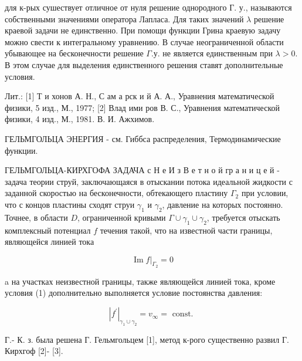 \documentclass[10pt]{article}
\begin{document}
для к-рых сушествует отличное от нуля решение однородного Г. у., называются собственными значениями оператора Лапласа. Для таких значений $\lambda$ решение краевой задачи не единственно. При помощи функции Грина краевую задачу можно свести к интегральному уравнению. В случае неограниченной области убывающее на бесконечности решение $\Gamma$.у. не является единственным при $\lambda>0$. В этом случае для выделения единственного решения ставят дополнительные условия.



Лит.: [1] Т и хонов А. Н., С ам а рск и й А. А., Уравнения математической физики, 5 изд., М., 1977; [2] Влад ими ров В. С., Уравнения математической физики, 4 изд., М., 1981. В. И. Ажхимов.



ГЕЛЬМГОЛЬЦА ЭНЕРГИЯ - см. Гиббса распределения, Термодинамические функции.



ГЕЛЬМГОЛЬЦА-КИРХГОФА ЗАДАЧА с Н е И з В е т н о й гр а н и ц е й - задача теории струй, заключающаяся в отыскании потока идеальной жидкости с заданной скоростью на бесконечности, обтекающего пластину $\Gamma_{2}$ при условии, что с концов пластины сходят струи $\gamma_{1}$ и $\gamma_{2}$, давление на которых постоянно. Точнее, в области $D$, ограниченной кривыми $\Gamma \cup \gamma_{1} \cup \gamma_{2}$, требуется отыскать комплексный потенциал $f$ течения такой, что на известной части границы, являющейся линией тока



\[

\left.\operatorname{Im} f\right|_{\Gamma_{2}}=0

\]



a на участках неизвестной границы, также являющейся линией тока, кроме условия (1) дополнительно выполняется условие постоянства давления:



\[

\left|f^{\prime}\right|_{\gamma_{1} \cup \gamma_{2}}=v_{\infty}=\text { const. }

\]



Г.- К. з. была решена Г. Гельмгольцем [1], метод к-рого существенно развил Г. Кирхгоф [2]- [3].
\end{document}
